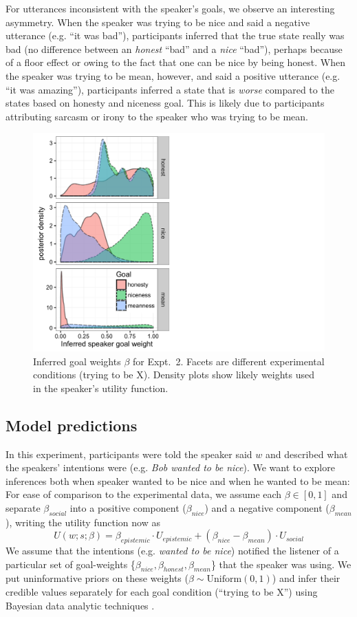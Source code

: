 \documentclass[10pt,letterpaper]{article}
\begin{document}
For utterances inconsistent with the speaker's goals, we observe an interesting asymmetry.
When the speaker was trying to be nice and said a negative utterance (e.g. ``it was bad''), participants inferred that the true state really was bad (no difference between an \emph{honest} ``bad'' and a \emph{nice} ``bad''), perhaps because of a floor effect or owing to the fact that one can be nice by being honest.
When the speaker was trying to be mean, however, and said a positive utterance (e.g. ``it was amazing''), participants inferred a state that is \emph{worse} compared to the states based on honesty and niceness goal.
This is likely due to participants attributing sarcasm or irony to the speaker who was trying to be mean.

\begin{figure}[!b] 
\begin{centering}
\includegraphics[width=0.70\columnwidth]{figures/goal-posterior.pdf}
\caption{\label{fig:goal-priors-bda} Inferred goal weights $\beta$ for Expt.~2.
Facets are different experimental conditions (trying to be X). 
Density plots show likely weights used in the speaker's utility function.
}
\end{centering}
\end{figure}


\subsection{Model predictions}

In this experiment, participants were told the speaker said $w$ and described what the speakers' intentions were (e.g. \emph{Bob wanted to be nice}).
We want to explore inferences both when speaker wanted to be nice and when he wanted to be mean: For ease of comparison to the experimental data, we assume each $\beta \in [0,1]$ and separate $\beta_{social}$ into a positive component ($\beta_{nice}$) and a negative component ($\beta_{mean}$), writing the utility function now as
$$
 U(w;s; \beta)  =  \beta_{epistemic}\cdot U_{epistemic} + (\beta_{nice} - \beta_{mean}) \cdot U_{social}
 $$
We assume that the intentions (e.g. \emph{wanted to be nice}) notified the listener of a particular set of goal-weights \{$\beta_{nice}, \beta_{honest}, \beta_{mean}$\} that the speaker was using.
We put uninformative priors on these weights ($\beta \sim \text{Uniform}(0,1)$) and infer their credible values separately for each goal condition (``trying to be X'') using Bayesian data analytic techniques \cite{LW2014}.
\end{document}
